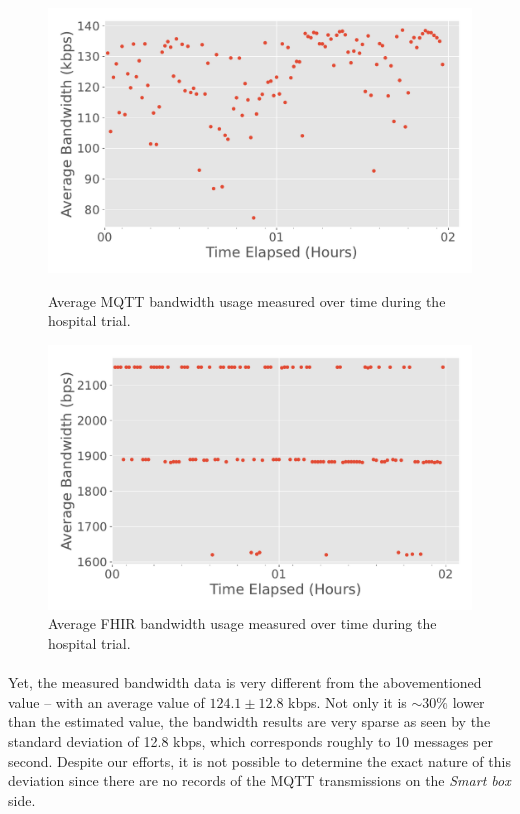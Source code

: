 \begin{figure}[H]
    \begin{minipage}{0.49\linewidth}
        \centering
        \includegraphics[width=\linewidth]{images/pilot_mqtt_bandwidth.pdf}
        \caption{Average \acs{MQTT} bandwidth usage measured over time during the hospital trial. }
        \label{fig:pilot-mqtt-bandwidth}
    \end{minipage}
    \hspace{0.02\linewidth}
    \begin{minipage}{0.49\linewidth}
        \centering
        \includegraphics[width=\linewidth]{images/pilot_fhir_bandwidth.pdf}
        \caption{Average \acs{FHIR} bandwidth usage measured over time during the hospital trial.}
        \label{fig:pilot-fhir-bandwidth}
    \end{minipage}
\end{figure}


\paragraph{} Yet, the measured bandwidth data is very different from the abovementioned value -- with an average value of {\color{blue}$124.1 \pm 12.8$} kbps. Not only it is ${\sim}  30\%$ lower than the estimated value, the bandwidth results are very sparse as seen by the standard deviation of {\color{blue}12.8} kbps, which corresponds roughly to 10 messages per second. Despite our efforts, it is not possible to determine the exact nature of this deviation since there are no records of the \acs{MQTT} transmissions on the \textit{Smart box} side. 

